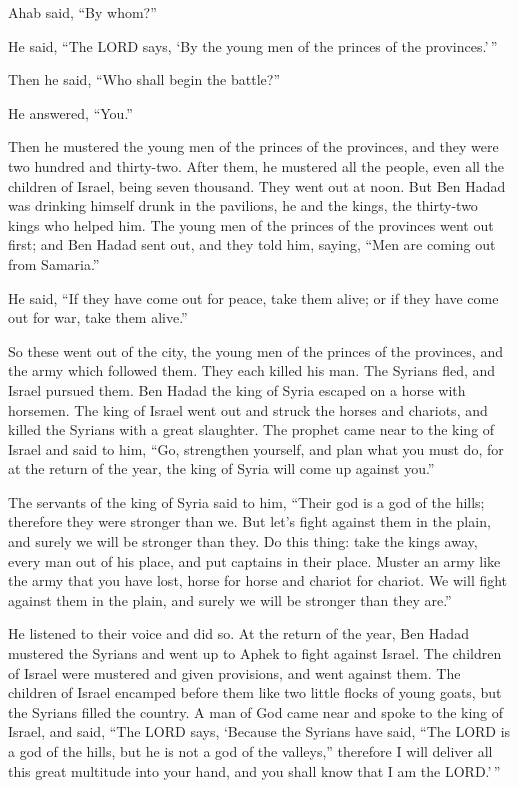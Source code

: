 Ahab said, ``By whom?''

He said, ``The LORD says, `By the young men of the princes of the
provinces.'\,''

Then he said, ``Who shall begin the battle?''

He answered, ``You.''

 Then he mustered the young men of the princes of the
provinces, and they were two hundred and thirty-two. After them, he
mustered all the people, even all the children of Israel, being seven
thousand.  They went out at noon. But Ben Hadad was
drinking himself drunk in the pavilions, he and the kings, the
thirty-two kings who helped him.  The young men of the
princes of the provinces went out first; and Ben Hadad sent out, and
they told him, saying, ``Men are coming out from Samaria.''

 He said, ``If they have come out for peace, take them
alive; or if they have come out for war, take them alive.''

 So these went out of the city, the young men of the
princes of the provinces, and the army which followed them.
 They each killed his man. The Syrians fled, and Israel
pursued them. Ben Hadad the king of Syria escaped on a horse with
horsemen.  The king of Israel went out and struck the
horses and chariots, and killed the Syrians with a great slaughter.
 The prophet came near to the king of Israel and said to
him, ``Go, strengthen yourself, and plan what you must do, for at the
return of the year, the king of Syria will come up against you.''

 The servants of the king of Syria said to him, ``Their
god is a god of the hills; therefore they were stronger than we. But
let's fight against them in the plain, and surely we will be stronger
than they.  Do this thing: take the kings away, every man
out of his place, and put captains in their place. 
Muster an army like the army that you have lost, horse for horse and
chariot for chariot. We will fight against them in the plain, and surely
we will be stronger than they are.''

He listened to their voice and did so.  At the return of
the year, Ben Hadad mustered the Syrians and went up to Aphek to fight
against Israel.  The children of Israel were mustered and
given provisions, and went against them. The children of Israel encamped
before them like two little flocks of young goats, but the Syrians
filled the country.  A man of God came near and spoke to
the king of Israel, and said, ``The LORD says, `Because the Syrians have
said, ``The LORD is a god of the hills, but he is not a god of the
valleys,'' therefore I will deliver all this great multitude into your
hand, and you shall know that I am the LORD.'\,''

